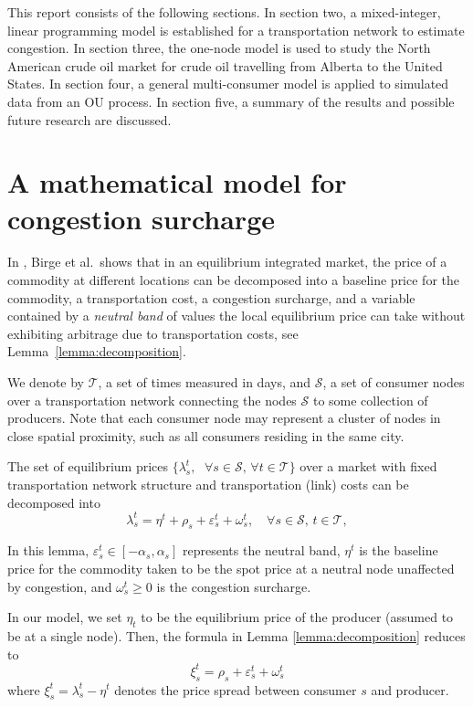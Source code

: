 \documentclass[11pt]{m2pi}
\newcommand{\cS}{\mathcal{S}}
\newcommand{\cT}{\mathcal{T}}
\newcommand{\ves}{\varepsilon}
\begin{document}
This report consists of the following sections. In section two, a mixed-integer, linear programming model is established for a transportation network to estimate congestion. In section three, the one-node model is used to study the North American crude oil market for crude oil travelling from Alberta to the United States. In section four, a general multi-consumer model is applied to simulated data from an OU process. In section five, a summary of the results and possible future research are discussed.

\section{A mathematical model for congestion surcharge}
In \cite{Zhu2020}, Birge et al.~shows that in an equilibrium integrated market, the price of a commodity at different locations can be decomposed into a baseline price for the commodity, a transportation cost, a congestion surcharge, and a variable contained by a \emph{neutral band} of values the local equilibrium price can take without exhibiting arbitrage due to transportation costs, see Lemma~\ref{lemma:decomposition}.

We denote by $\cT$, a set of times measured in days, and $\cS$, a set of consumer nodes over a transportation network connecting the nodes $\cS$ to some collection of producers. Note that each consumer node may represent a cluster of nodes in close spatial proximity, such as all consumers residing in the same city.

\begin{lemma}\label{lemma:decomposition}
The set of equilibrium prices $\{\lambda_s^t,~~\,\forall s\in\cS,\,\forall t\in\cT\}$ over a market with fixed transportation network structure and transportation (link) costs can be decomposed into
\[\lambda_s^t = \eta^t+\rho_s+\ves_s^t +\omega_s^t,\quad \forall s\in\cS,\,t\in\cT,\]
\end{lemma}

In this lemma, $\ves_s^t\in[-\alpha_s, \alpha_s]$ represents the neutral band, $\eta^t$ is the baseline price for the commodity taken to be the spot price at a neutral node unaffected by congestion, and $\omega_s^t\geq 0$ is the congestion surcharge. 

In our model, we set $\eta_t$ to be the equilibrium price of the producer (assumed to be at a single node). Then, the formula in Lemma \ref{lemma:decomposition} reduces to 
\[\xi_s^t = \rho_s + \ves_s^t +\omega_s^t\] where $\xi^t_s = \lambda_s^t - \eta^t$ denotes the price spread between consumer $s$ and producer. 
\end{document}
